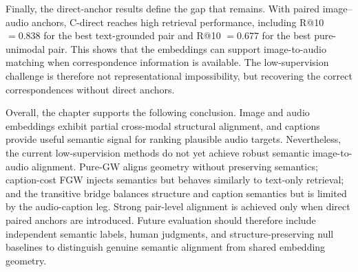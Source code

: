 Finally, the direct-anchor results define the gap that remains. With paired image--audio anchors, C-direct reaches high retrieval performance, including R@10 $=0.838$ for the best text-grounded pair and R@10 $=0.677$ for the best pure-unimodal pair. This shows that the embeddings can support image-to-audio matching when correspondence information is available. The low-supervision challenge is therefore not representational impossibility, but recovering the correct correspondences without direct anchors.

Overall, the chapter supports the following conclusion. Image and audio embeddings exhibit partial cross-modal structural alignment, and captions provide useful semantic signal for ranking plausible audio targets. Nevertheless, the current low-supervision methods do not yet achieve robust semantic image-to-audio alignment. Pure-GW aligns geometry without preserving semantics; caption-cost FGW injects semantics but behaves similarly to text-only retrieval; and the transitive bridge balances structure and caption semantics but is limited by the audio-caption leg. Strong pair-level alignment is achieved only when direct paired anchors are introduced. Future evaluation should therefore include independent semantic labels, human judgments, and structure-preserving null baselines to distinguish genuine semantic alignment from shared embedding geometry.
